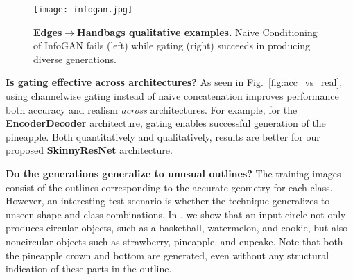 
\begin{figure}[t]
    \centering
    \texttt{[image: infogan.jpg]}
    \caption{{\bf Edges$\rightarrow$Handbags qualitative examples.} Naive Conditioning of InfoGAN fails (left) while gating (right) succeeds in producing diverse generations.}\label{fig:infogan_gate}
    \vspace{-2mm}
\end{figure}

\noindent \textbf{Is gating effective across architectures?} 
As seen in Fig.~\ref{fig:acc_vs_real}, using channelwise gating instead of naive concatenation improves performance both accuracy and realism \textit{across} architectures. For example, for the \textbf{EncoderDecoder} architecture, gating enables successful generation of the pineapple.
Both quantitatively and qualitatively, results are better for our proposed \textbf{SkinnyResNet} architecture.


\noindent \textbf{Do the generations generalize to unusual outlines?} The training images consist of the outlines corresponding to the accurate geometry for each class. However, an interesting test scenario is whether the technique generalizes to unseen shape and class combinations. In , we show that an input circle  not only produces circular objects, such as a basketball, watermelon, and cookie, but also noncircular objects such as strawberry, pineapple, and cupcake. Note that both the pineapple crown and bottom are generated, even without any structural indication of these parts in the outline.

